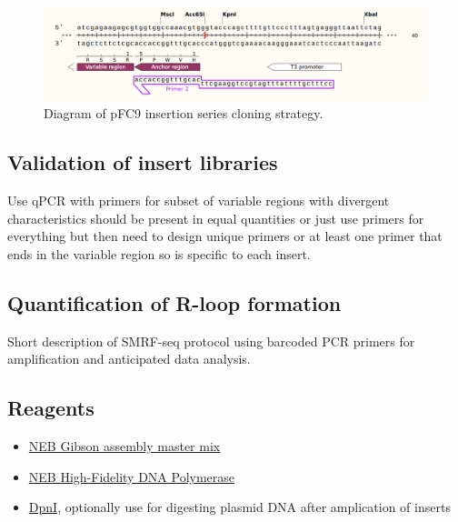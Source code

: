 \documentclass[11pt]{article}
\begin{document}
\begin{figure}[H]
	\includegraphics[width=15cm]{images/primers/tac_term_primers/anchor-terminators.png}
	\centering
	\caption{Diagram of pFC9 insertion series cloning strategy.}
\end{figure}


\subsection{Validation of insert libraries}

Use qPCR with primers for subset of variable regions with divergent characteristics should be present in equal quantities or just use primers for everything but then need to design unique primers or at least one primer that ends in the variable region so is specific to each insert. 

\subsection{Quantification of R-loop formation }

Short description of SMRF-seq protocol using barcoded PCR primers for amplification 
and anticipated data analysis. 

\subsection{Reagents}

\begin{itemize}
	\item \href{https://www.neb.com/products/e2611-gibson-assembly-master-mix#Product\%20Information_Properties\%20\&\%20Usage}{NEB Gibson assembly master mix}
	\item \href{https://www.neb.com/products/m0491-q5-high-fidelity-dna-polymerase#Product\%20Information}{NEB High-Fidelity DNA Polymerase}
	\item \href{https://www.neb.com/products/r0176-dpni?__cf_chl_jschl_tk__=d22d8cb49b9b2d4ff2532de61875fea36af4066f-1626291600-0-ARBMmni5PdhcCrqckk9zN05YGR50cB-otICbDTrUStRYlPQzdrbyJvjEOoI2QusMU-HOcKBcontIQfQRYoQqN9R2hNCL0XzFa2hP3-_c6Vf1sL2Sb2Bs_DXW38t8Oc1NxSg0caQ4FlAGqVNswAJaml9BhLC5dWj1sCuqKwDj72JKO8eI9d3mlCcNVIAVs8n1xFpuo1_oyafffkTnQ-ysv358pg1RrIbChfkwqXctDQennQm_CRjVjuitrXFFNjgAqBDJBKFRMZKkoOYlTDEDBsuaQaQtMxNwL5u7yIJ5mNCrkkuiikIGg7Was3tNj1d7D-7bnJrfXr8jIfG3qW6kvIkrZBJey0JQAVMQGVc4Ps0t0_iS3P4ahcZRytZezR6Fq9lrMqGJkB_Xmxyr0cVoXrbIv136yLISC-RPNR4MDWXe#Product\%20Information}{DpnI}, optionally use for digesting plasmid DNA after amplication of inserts
\end{itemize}
\end{document}
